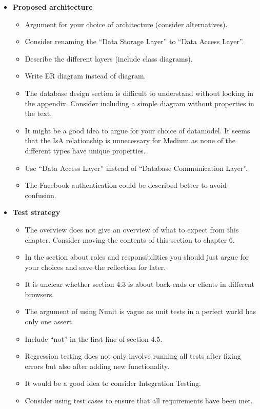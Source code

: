 \documentclass[../report.tex]{subfiles}
\begin{document}
\begin{itemize}
\item \textbf{Proposed architecture}
	\begin{itemize}
	\item Argument for your choice of architecture (consider alternatives).
	\item Consider renaming the ``Data Storage Layer'' to ``Data Access Layer''.
	\item Describe the different layers (include class diagrams).
	\item Write ER diagram instead of diagram.
	\item The database design section is difficult to understand without looking in the appendix. Consider including a simple diagram without properties in the text.
	\item It might be a good idea to argue for your choice of datamodel. It seems that the IsA relationship is unnecessary for Medium as none of the different types have unique properties.
	\item Use ``Data Access Layer'' instead of ``Database Communication Layer''.
	\item The Facebook-authentication could be described better to avoid confusion.
	\end{itemize}

\item \textbf{Test strategy}
	\begin{itemize}
	\item The overview does not give an overview of what to expect from this chapter. Consider moving the contents of this section to chapter 6.
	\item In the section about roles and responsibilities you should just argue for your choices and save the reflection for later.
	\item It is unclear whether section 4.3 is about back-ends or clients in different browsers.
	\item The argument of using Nunit is vague as unit tests in a perfect world has only one assert.
	\item Include ``not'' in the first line of section 4.5.
	\item Regression testing does not only involve running all tests after fixing errors but also after adding new functionality.
	\item It would be a good idea to consider Integration Testing.
	\item Consider using test cases to ensure that all requirements have been met.
	\end{itemize}


\end{itemize}
\end{document}
